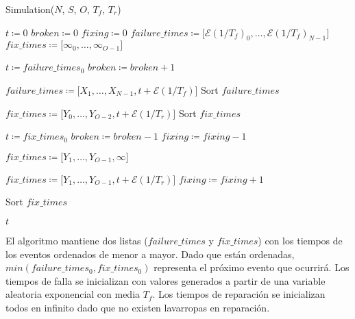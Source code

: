     \begin{algorithm} [H]
    \caption{Simulation($N$, $S$, $O$, $T_f$, $T_r$)}
    \label{alg}
    \begin{algorithmic} [1]
    \STATE $ t \coloneqq  0 $
    \STATE $ broken \coloneqq  0 $
    \STATE $ fixing \coloneqq  0 $
    \STATE $ failure\_times \coloneqq \lbrack  \mathcal{E}(1/T_f)_0, \dots , \mathcal{E}(1/T_f)_{N-1} \rbrack $
    \STATE $ fix\_times \coloneqq  \lbrack \infty_0, \dots, \infty_{O-1}\rbrack $


      \STATE $ t \coloneqq failure\_times_0$
      \STATE $ broken \coloneqq broken + 1 $

        \STATE $ failure\_times \coloneqq \lbrack X_1, \dots, X_{N-1}, t +
         \mathcal{E}(1/T_f)\rbrack $
        \STATE Sort $ failure\_times $
      \ENDIF

        \STATE $ fix\_times \coloneqq \lbrack Y_0, \dots, Y_{O-2}, t + \mathcal{E}(1/T_r)\rbrack $
        \STATE Sort $ fix\_times $
      \ENDIF

    \ELSE

      \STATE $ t \coloneqq fix\_times_0 $
      \STATE $ broken \coloneqq broken - 1 $
      \STATE $ fixing \coloneqq fixing - 1 $

        \STATE $ fix\_times \coloneqq \lbrack Y_1, \dots, Y_{O-1}, \infty \rbrack $
      \ENDIF

        \STATE $ fix\_times \coloneqq \lbrack Y_1, \dots, Y_{O-1}, t + \mathcal{E}(1/T_r)\rbrack $
        \STATE $ fixing \coloneqq fixing + 1 $

      \ENDIF
      \STATE Sort $ fix\_times $

    \ENDIF
    \ENDWHILE
    \RETURN $ t $
    \end{algorithmic}
    \end{algorithm}

    \par El algoritmo mantiene dos listas ($ failure\_times$ y $fix\_times $)
    con los tiempos de los eventos ordenados de menor a mayor. Dado que están
    ordenadas, $ min(failure\_times_0, fix\_times_0) $ representa el próximo
    evento que ocurrirá. Los tiempos de falla se inicializan con valores
    generados a partir de una variable aleatoria exponencial con media $T_f$.
    Los tiempos de reparación se inicializan todos en infinito dado que no
    existen lavarropas en reparación.

